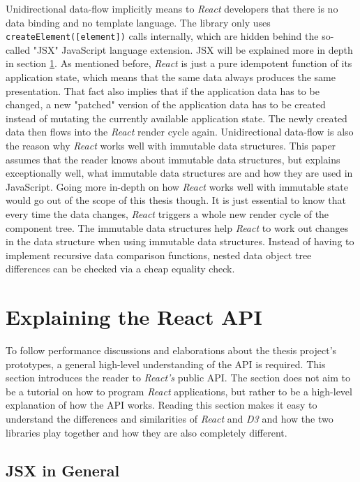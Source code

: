Unidirectional data-flow implicitly means to \emph{React} developers that there is no data binding and no template language. The library only uses \texttt{createElement([element])} calls internally, which are hidden behind the so-called "JSX" JavaScript language extension. JSX will be explained more in depth in section \ref{sec:reactApi}. As mentioned before, \emph{React} is just a pure idempotent function of its application state, which means that the same data always produces the same presentation. That fact also implies that if the application data has to be changed, a new "patched" version of the application data has to be created instead of mutating the currently available application state. The newly created data then flows into the \emph{React} render cycle again. Unidirectional data-flow is also the reason why \emph{React} works well with immutable data structures. This paper assumes that the reader knows about immutable data structures, but \cite{ImmutableJS} explains exceptionally well, what immutable data structures are and how they are used in JavaScript. Going more in-depth on how \emph{React} works well with immutable state would go out of the scope of this thesis though. It is just essential to know that every time the data changes,  \emph{React} triggers a whole new render cycle of the component tree. The immutable data structures help \emph{React} to work out changes in the data structure when using immutable data structures. Instead of having to implement recursive data comparison functions, nested data object tree differences can be checked via a cheap equality check.

\section{Explaining the React API}
\label{sec:reactApi}

To follow performance discussions and elaborations about the thesis project's prototypes, a general high-level understanding of the API is required. This section introduces the reader to \emph{React's} public API. The section does not aim to be a tutorial on how to program \emph{React} applications, but rather to be a high-level explanation of how the API works. Reading this section makes it easy to understand the differences and similarities of \emph{React} and \emph{D3} and how the two libraries play together and how they are also completely different.

\subsection{JSX in General}

